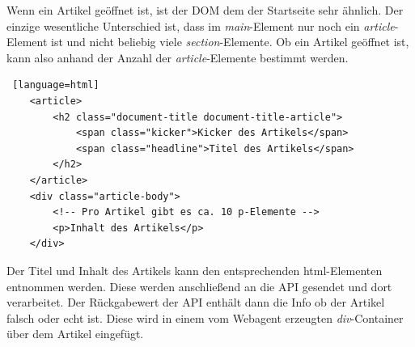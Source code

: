 Wenn ein Artikel geöffnet ist, ist der DOM dem der Startseite sehr ähnlich. Der einzige wesentliche Unterschied ist, dass im \textit{main}-Element
nur noch ein \textit{article}-Element ist und nicht beliebig viele \textit{section}-Elemente.
Ob ein Artikel geöffnet ist, kann also anhand der Anzahl der \textit{article}-Elemente bestimmt werden.

\begin{lstlisting} [language=html]
    <article>
        <h2 class="document-title document-title-article">
            <span class="kicker">Kicker des Artikels</span>
            <span class="headline">Titel des Artikels</span>
        </h2>
    </article>
    <div class="article-body">
        <!-- Pro Artikel gibt es ca. 10 p-Elemente -->
        <p>Inhalt des Artikels</p>
    </div>
\end{lstlisting}

Der Titel und Inhalt des Artikels kann den entsprechenden html-Elementen entnommen werden.
Diese werden anschließend an die API gesendet und dort verarbeitet. 
Der Rückgabewert der API enthält dann die Info ob der Artikel falsch oder echt ist.
Diese wird in einem vom Webagent erzeugten \textit{div}-Container über dem Artikel eingefügt.
    
    
    